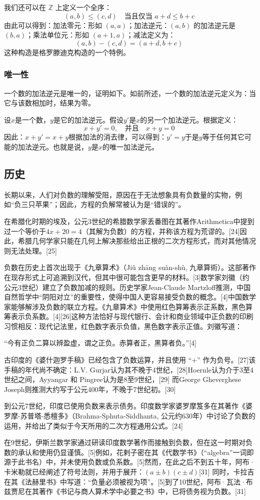我们还可以在 $\mathbb{Z}$ 上定义一个全序：
$$
(a, b) \leq (c, d) \quad \text{当且仅当 } a + d \leq b + c~
$$
由此可以得到：加法零元：形如 $(a, a)$；加法逆元：$(a, b)$ 的加法逆元是 $(b, a)$；乘法单位元：形如 $(a+1, a)$；减法定义为：
  $$
  (a, b) - (c, d) = (a + d, b + c)~
  $$
这种构造是格罗滕迪克构造的一个特例。
\subsubsection{唯一性}
一个数的加法逆元是唯一的，证明如下。如前所述，一个数的加法逆元定义为：当它与该数相加时，结果为零。

设$x$是一个数，$y$是它的加法逆元。假设$y'$是$x$的另一个加法逆元。根据定义：
$$
x + y' = 0, \quad \text{并且} \quad x + y = 0~
$$
因此：$x + y' = x + y$根据加法的消去律，可以得到：$y' = y$于是$y$等于任何其它可能的加法逆元。也就是说，$y$是$x$的唯一加法逆元。
\subsection{历史}
长期以来，人们对负数的理解受阻，原因在于无法想象具有负数量的实物，例如“负三只苹果”；因此，方程的负解常被认为是“错误的”。

在希腊化时期的埃及，公元3世纪的希腊数学家丢番图在其著作Arithmetica中提到过一个等价于$4x + 20 = 4$（其解为负数）的方程，并称该方程为荒谬的。[24]因此，希腊几何学家只能在几何上解决那些给出正根的二次方程形式，而对其他情况则无法处理。[25]

负数在历史上首次出现于《九章算术》（Jiǔ zhāng suàn-shù, 九章算術）。这部著作在现存形式上可追溯到汉代，但其中很可能包含更早的材料。[3]数学家刘徽（约公元3世纪）建立了负数加减的规则。历史学家Jean-Claude Martzloff推测，中国自然哲学中“阴阳对立”的重要性，使得中国人更容易接受负数的概念。[4]中国数学家能够解涉及负数的联立方程。《九章算术》中使用红色算筹表示正系数，黑色算筹表示负系数。[4][26]这种方法恰好与现代银行、会计和商业领域中正负数的印刷习惯相反：现代记法里，红色数字表示负值，黑色数字表示正值。刘徽写道：

“今有正负二算以辨盈虚，谓之正负。赤算者正，黑算者负。”[4]

古印度的《婆什迦罗手稿》已经包含了负数运算，并且使用 “+” 作为负号。[27]该手稿的年代尚不确定：L.V. Gurjar认为其不晚于4世纪，[28]Hoernle认为介于3至4世纪之间，Ayyangar 和 Pingree认为是8至9世纪，[29] 而George Gheverghese Joseph则推测大约写于公元400年，不晚于7世纪初。[30]

到公元7世纪，印度已使用负数来表示债务。印度数学家婆罗摩笈多在其著作《婆罗摩-苏普塔-悉檀多》（Brahma-Sphuta-Siddhanta, 公元约630年）中讨论了负数的运用，并给出了类似于今天所用的二次方程通用公式。[24]

在9世纪，伊斯兰数学家通过研读印度数学著作而接触到负数，但在这一时期对负数的承认和使用仍显谨慎。[5]例如，花剌子密在其《代数学书》（“algebra”一词即源于此书名）中，并未使用负数或负系数。[5]然而，在此之后不到五十年，阿布·卡米勒就已经阐述了符号法则，并用于展开：$(a \pm b)(c \pm d)$[31] 同时，卡拉吉在其《法赫里书》中写道：“负量必须被视为项”。[5]到了10世纪，阿布·瓦法·布兹贾尼在其著作《书记与商人算术学中必要之书》中，已将债务视为负数。[31]
